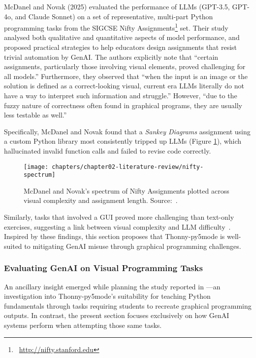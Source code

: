 McDanel and Novak (2025) evaluated the performance of LLMs (GPT-3.5, GPT-4o, and Claude Sonnet) on a set of representative, multi-part Python programming tasks from the SIGCSE Nifty Assignments\footnote{~\url{http://nifty.stanford.edu}} set. Their study analysed both qualitative and quantitative aspects of model performance, and proposed practical strategies to help educators design assignments that resist trivial automation by GenAI. The authors explicitly note that ``certain assignments, particularly those involving visual elements, proved challenging for all models.'' Furthermore, they observed that ``when the input is an image or the solution is defined as a correct-looking visual, current era LLMs literally do not have a way to interpret such information and struggle.'' However, ``due to the fuzzy nature of correctness often found in graphical programs, they are usually less testable as well.''~\cite{mcdanel_designing_2025}

Specifically, McDanel and Novak found that a \textit{Sankey Diagrams} assignment using a custom Python library most consistently tripped up LLMs (Figure \ref{fig:nifty-spectrum}), which hallucinated invalid function calls and failed to revise code correctly.

\begin{figure}[htbp]
\centering
\texttt{[image: chapters/chapter02-literature-review/nifty-spectrum]}
\caption{McDanel and Novak's spectrum of Nifty Assignments plotted across visual complexity and assignment length. Source:~\cite{mcdanel_designing_2025}.}
\label{fig:nifty-spectrum}
\end{figure}

Similarly, tasks that involved a GUI proved more challenging than text-only exercises, suggesting a link between visual complexity and LLM difficulty~\cite{mcdanel_designing_2025}. Inspired by these findings, this section proposes that Thonny-py5mode is well-suited to mitigating GenAI misuse through graphical programming challenges.

\subsubsection{Evaluating GenAI on Visual Programming Tasks}

An ancillary insight emerged while planning the study reported in \textit{}---an investigation into Thonny-py5mode's suitability for teaching Python fundamentals through tasks requiring students to recreate graphical programming outputs. In contrast, the present section focuses exclusively on how GenAI systems perform when attempting those same tasks.

